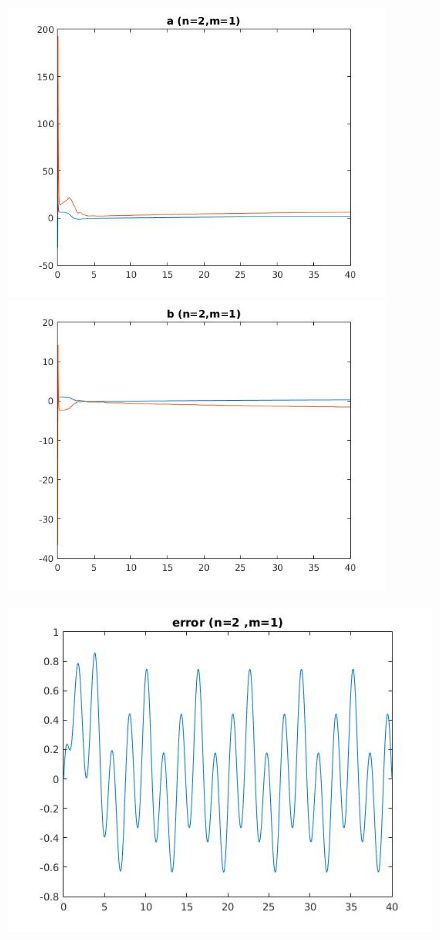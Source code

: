 \documentclass{article}
\begin{document}
\clearpage
\large
\begin{figure}[h!]
\centering 
 	  \begin{minipage}{0.48\textwidth}
     \centering
     \advance\leftskip-4cm
  \includegraphics[width=100mm,scale=2]{assets/try21o.jpg}
   \end{minipage} \hfill
    \begin{minipage}{0.48\textwidth}
  \includegraphics[width=100mm,scale=2]{assets/try21oo.jpg}
  \end{minipage}
\end{figure}
\begin{figure}[h!]
\centering
\advance\leftskip-0.5cm
 \includegraphics[width=130mm,scale=2]{assets/try21ooo.jpg}
\end{figure}
\end{document}
